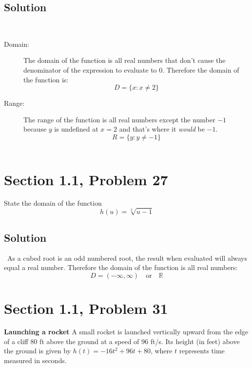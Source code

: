 \documentclass{article}
\newcommand{\problem}[2]{\vspace{5ex}\section*{Section #1, Problem #2}}
\newcommand{\solution}{\subsection*{Solution}}
\begin{document}
\solution\
\begin{description}
\item[Domain:] The domain of the function is all real numbers that don't cause the denominator of the expression to evaluate to $0$. Therefore the domain of the function is:
  \[
    D = \{x: x \neq 2\}
  \]
\item[Range:]
  \begin{multicols}{2}
    The range of the function is all real numbers except the number $-1$ because $y$ is undefined at
    $x = 2$ and that's where it \textit{would} be $-1$.
    \[
      R = \{y: y \neq -1\}
    \]
  \columnbreak\
    \begin{figure}[H]
    \end{figure}
  \end{multicols}
\end{description}

\problem{1.1}{27}
State the domain of the function
\[
  h(u) = \sqrt[3]{u - 1}
\]

\solution\
As a cubed root is an odd numbered root, the result when evaluated will always equal a real number. Therefore the domain of the function is all real numbers:
\[
  D = (-\infty, \infty) \quad \text{or} \quad \mathbb{R}
\]

\problem{1.1}{31}
\textbf{Launching a rocket} A small rocket is launched vertically upward from the
edge of a cliff 80 ft above the ground at a speed of 96 ft/s. Its height (in feet) above the ground
is given by $h(t) = -16t^2 + 96t + 80$, where $t$ represents time measured in seconds.
\end{document}
